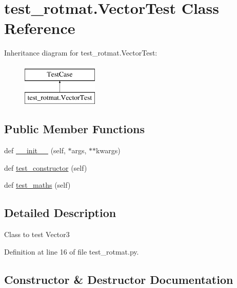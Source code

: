 \hypertarget{classtest__rotmat_1_1VectorTest}{}\section{test\+\_\+rotmat.\+Vector\+Test Class Reference}
\label{classtest__rotmat_1_1VectorTest}
Inheritance diagram for test\+\_\+rotmat.\+Vector\+Test\+:\begin{figure}[H]
\begin{center}
\leavevmode
\includegraphics[height=2.000000cm]{classtest__rotmat_1_1VectorTest}
\end{center}
\end{figure}
\subsection*{Public Member Functions}
\begin{DoxyCompactItemize}
\item 
def \mbox{\hyperlink{classtest__rotmat_1_1VectorTest_a2e695e9d739195db4fff1767e7ce1992}{\+\_\+\+\_\+init\+\_\+\+\_\+}} (self, $\ast$args, $\ast$$\ast$kwargs)
\item 
def \mbox{\hyperlink{classtest__rotmat_1_1VectorTest_a8b76e1cd6c7eb26849aa5d8722812d94}{test\+\_\+constructor}} (self)
\item 
def \mbox{\hyperlink{classtest__rotmat_1_1VectorTest_a00794bb3325f4433875679a6872824ef}{test\+\_\+maths}} (self)
\end{DoxyCompactItemize}


\subsection{Detailed Description}
\begin{DoxyVerb}Class to test Vector3
\end{DoxyVerb}
 

Definition at line 16 of file test\+\_\+rotmat.\+py.



\subsection{Constructor \& Destructor Documentation}
\mbox{\label{classtest__rotmat_1_1VectorTest_a2e695e9d739195db4fff1767e7ce1992}} 
